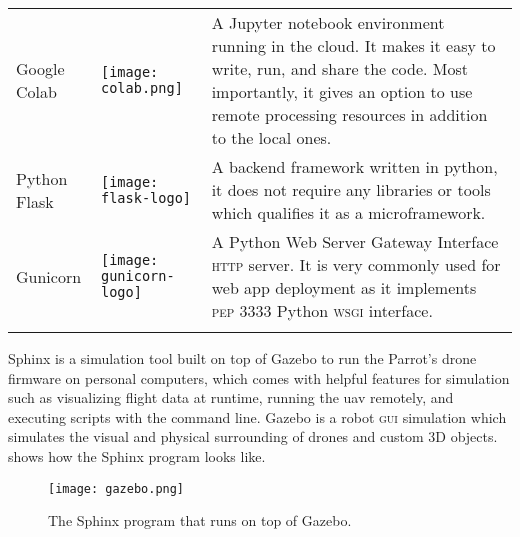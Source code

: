 \documentclass[../main.tex]{subfiles}
\begin{document}
\begin{table}[p]
\begin{tabular}{ p{3cm} p{3cm} p{6cm} }
        Google Colab 
            & 
            \raisebox{-0.9\height}
            {\texttt{[image: colab.png]}}
                & A Jupyter notebook environment
                running in the cloud. 
                It makes it easy to write, run, 
                and share the code. Most importantly, 
                it gives an option to use remote 
                processing resources in addition to the 
                local ones. \\ 
                \addlinespace
		Python Flask
		& 
		\raisebox{-0.9\height}
		{\texttt{[image: flask-logo]}}
		& A backend framework written in python, 
		it does not require any libraries or tools 
		which qualifies it as a microframework. 
		\\ 
				\addlinespace
		Gunicorn
		& 
		\raisebox{-0.9\height}
		{\texttt{[image: gunicorn-logo]}}
		& A Python Web Server Gateway Interface \textsc{http} server.
		It is very commonly used for web app deployment as it implements 
		\textsc{pep} 3333 Python \textsc{wsgi} interface.
		
				\\ 
				\addlinespace				
		
        \bottomrule
    \end{tabular}
\end{table}

Sphinx is a simulation 
tool built on top of Gazebo 
to run the Parrot's drone firmware on 
personal computers, which comes with helpful 
features for simulation such as visualizing flight 
data at runtime, running the \gls{uav} remotely, 
and executing scripts with the command line. 
Gazebo is a robot \textsc{gui} simulation 
which simulates the visual and physical surrounding 
of drones and custom 3D objects. 
 shows how the Sphinx 
program looks like. 

\begin{figure}[tbp]
    \centering
    \texttt{[image: gazebo.png]}
    \caption{The Sphinx program that runs on top of Gazebo.}
    \label{fig:gazebo}
\end{figure}
\end{document}
